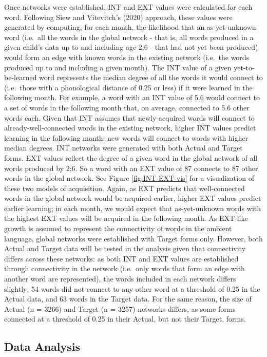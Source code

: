 \documentclass[
  man]{apa6}
\begin{document}
Once networks were established, INT and EXT values were calculated for each word. Following Siew and Vitevitch's (2020) approach, these values were generated by computing, for each month, the likelihood that an as-yet-unknown word (i.e.~all the words in the global network - that is, all words produced in a given child's data up to and including age 2;6 - that had not yet been produced) would form an edge with known words in the existing network (i.e.~the words produced up to and including a given month). The INT value of a given yet-to-be-learned word represents the median degree of all the words it would connect to (i.e.~those with a phonological distance of 0.25 or less) if it were learned in the following month. For example, a word with an INT value of 5.6 would connect to a set of words in the following month that, on average, connected to 5.6 other words each. Given that INT assumes that newly-acquired words will connect to already-well-connected words in the existing network, higher INT values predict learning in the following month: new words will connect to words with higher median degrees. INT networks were generated with both Actual and Target forms. EXT values reflect the degree of a given word in the global network of all words produced by 2;6. So a word with an EXT value of 87 connects to 87 other words in the global network. See Figure \ref{fig:INT-EXT-vis} for a visualization of these two models of acquisition. Again, as EXT predicts that well-connected words in the global network would be acquired earlier, higher EXT values predict earlier learning; in each month, we would expect that as-yet-unknown words with the highest EXT values will be acquired in the following month. As EXT-like growth is assumed to represent the connectivity of words in the ambient language, global networks were established with Target forms only. However, both Actual and Target data will be tested in the analysis given that connectivity differs across these networks: as both INT and EXT values are established through connectivity in the network (i.e.~only words that form an edge with another word are represented), the words included in each network differs slightly; 54 words did not connect to any other word at a threshold of 0.25 in the Actual data, and 63 words in the Target data. For the same reason, the size of Actual (n = 3266) and Target (n = 3257) networks differs, as some forms connected at a threshold of 0.25 in their Actual, but not their Target, forms.

\hypertarget{data-analysis}{%
\subsection{Data Analysis}\label{data-analysis}}
\end{document}
